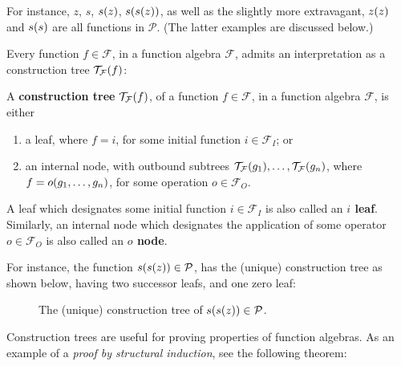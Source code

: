 For instance, $z$, $s$, $s{\mathopen{}\left({z}\right)\mathclose{}}$, $s{\mathopen{}\left({s{\mathopen{}\left({z}\right)\mathclose{}}}\right)\mathclose{}}$, as well as the slightly more
extravagant, $z{\mathopen{}\left({z}\right)\mathclose{}}$ and $s{\mathopen{}\left({s}\right)\mathclose{}}$ are all functions in $\mathcal{P}$. (The
latter examples are discussed below.)

Every function $f \in \mathcal{F}$, in a function algebra $\mathcal{F}$, admits
an interpretation as a construction tree $\mathcal{T}_\mathcal{F}{\mathopen{}\left({f}\right)\mathclose{}}$:

\begin{definition} \label{def:construction-tree} A \textbf{construction tree}
$\mathcal{T}_\mathcal{F}{\mathopen{}\left({f}\right)\mathclose{}}$, of a function $f \in \mathcal{F}$, in a
function algebra $\mathcal{F}$, is either

\begin{enumerate}[label=(\arabic*)]

\item a leaf, where $f = i$, for some initial function $i \in \mathcal{F}_I$;
or

\item an internal node, with outbound subtrees $\mathcal{T}_\mathcal{F}{\mathopen{}\left({g_1}\right)\mathclose{}},
\ldots, \mathcal{T}_\mathcal{F}{\mathopen{}\left({g_n}\right)\mathclose{}}$, where $f = o{\mathopen{}\left({g_1, \ldots, g_n}\right)\mathclose{}}$, for
some operation $o \in \mathcal{F}_O$.

\end{enumerate}

\end{definition}

A leaf which designates some initial function $i \in \mathcal{F}_I$ is also
called an \textbf{$i$ leaf}. Similarly, an internal node which designates the
application of some operator $o \in \mathcal{F}_O$ is also called an
\textbf{$o$ node}.

For instance, the function $s{\mathopen{}\left({s{\mathopen{}\left({z}\right)\mathclose{}}}\right)\mathclose{}} \in \mathcal{P}$, has the (unique)
construction tree as shown below, having two successor leafs, and one zero
leaf:

\begin{figure}[h!]
\centering
{}
\caption[]{The (unique) construction tree of $s{\mathopen{}\left({s{\mathopen{}\left({z}\right)\mathclose{}}}\right)\mathclose{}} \in \mathcal{P}$.}
\label{fig:s-s-z}
\end{figure}

Construction trees are useful for proving properties of function algebras.  As
an example of a \emph{proof by structural induction}, see the following
theorem:


